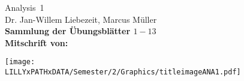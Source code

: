 \documentclass[Uebungsblatt,Jake]{Lilly}
\begin{document}
  
\def\maxcnt{13}

\begin{center}
{\fontsize{36}{36}\selectfont Ana\-ly\-sis~1}\smallskip\\
{Dr. Jan-Willem Liebezeit, Marcus Müller}\medskip\\
\Large\bfseries Sammlung der Übungsblätter $1-\maxcnt$\\
Mitschrift von: \AUTHOR
\end{center}
\vspace{1em}
\begin{center}
\texttt{[image: \\LILLYxPATHxDATA/Semester/2/Graphics/titleimageANA1.pdf]}
\end{center}
\hbox{}\vfill
\listofMYUBLIST
\vfill\hbox{}
\clearpage
  {%
  }%
  \clearpage




\renewcommand{\Hcolor}{AppleGreen}

\setcounter{ctr_TSK}{0}
\setlength{\LILLYxNegativeSkip}{-1\baselineskip}

\end{document}
